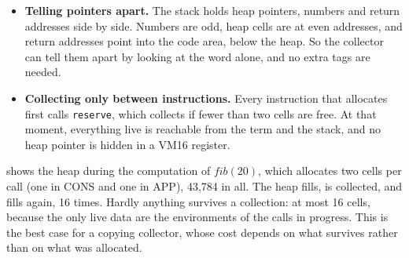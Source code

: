 \documentclass[11pt,a4paper]{article}
\newcommand{\ins}[1]{\textsf{#1}}
\theoremstyle{definition}
\theoremstyle{plain}
\begin{document}
\begin{itemize}[itemsep=2pt]
\item \textbf{Telling pointers apart.} The stack holds heap pointers, numbers
  and return addresses side by side. Numbers are odd, heap cells are at even
  addresses, and return addresses point into the code area, below the heap.
  So the collector can tell them apart by looking at the word alone, and no
  extra tags are needed.
\item \textbf{Collecting only between instructions.} Every instruction that
  allocates first calls \texttt{reserve}, which collects if fewer than two
  cells are free. At that moment, everything live is reachable from the term
  and the stack, and no heap pointer is hidden in a VM16 register.
\end{itemize}

 shows the heap during the computation of
$\mathit{fib}(20)$, which allocates two cells per call (one in \ins{CONS} and
one in \ins{APP}), 43,784 in all. The heap fills, is collected, and fills
again, 16 times. Hardly anything survives a collection: at most 16 cells,
because the only live data are the environments of the calls in progress.
This is the best case for a copying collector, whose cost depends on what
survives rather than on what was allocated.
\end{document}
